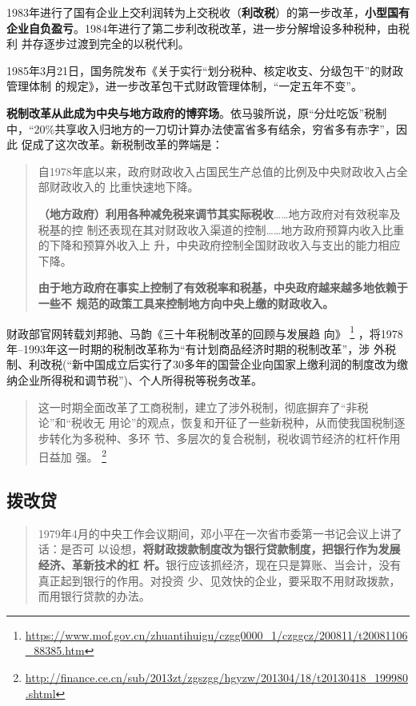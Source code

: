 1983年进行了国有企业上交利润转为上交税收（\textbf{利改税}）的第一步改革，\textbf{小型国有
  企业自负盈亏}。1984年进行了第二步利改税改革，进一步分解增设多种税种，由税利
并存逐步过渡到完全的以税代利。

1985年3月21日，国务院发布《关于实行“划分税种、核定收支、分级包干”的财政管理体制
的规定》，进一步改革包干式财政管理体制，“一定五年不变”。

\textbf{税制改革从此成为中央与地方政府的博弈场}。依马骏所说，原“分灶吃饭”税制
中，“20\%共享收入归地方的一刀切计算办法使富省多有结余，穷省多有赤字”，因此
促成了这次改革。新税制改革的弊端是：
\begin{quotation}
  自1978年底以来，政府财政收入占国民生产总值的比例及中央财政收入占全部财政收入的
  比重快速地下降。

  \textbf{（地方政府）利用各种减免税来调节其实际税收}……地方政府对有效税率及税基的控
  制还表现在其对财政收入渠道的控制……地方政府预算内收入比重的下降和预算外收入上
  升，中央政府控制全国财政收入与支出的能力相应下降。

  \textbf{由于地方政府在事实上控制了有效税率和税基，中央政府越来越多地依赖于一些不
    规范的政策工具来控制地方向中央上缴的财政收入。}\cite{majuncaigai}
\end{quotation}

财政部官网转载刘邦驰、马韵《三十年税制改革的回顾与发展趋
向》
\footnote{\url{https://www.mof.gov.cn/zhuantihuigu/czgg0000_1/czggcz/200811/t20081106_88385.htm}}
，将1978年--1993年这一时期的税制改革称为“有计划商品经济时期的税制改革”，涉
外税制、利改税(“新中国成立后实行了30多年的国营企业向国家上缴利润的制度改为缴
纳企业所得税和调节税”)、个人所得税等税务改革。
\begin{quotation}
  这一时期全面改革了工商税制，建立了涉外税制，彻底摒弃了“非税论”和“税收无
  用论”的观点，恢复和开征了一些新税种，从而使我国税制逐步转化为多税种、多环
  节、多层次的复合税制，税收调节经济的杠杆作用日益加
  强。
  \footnote{\url{http://finance.ce.cn/sub/2013zt/zgszgg/hgyzw/201304/18/t20130418_199980.shtml}}
\end{quotation}


\subsection{拨改贷}

\begin{quotation}
  1979年4月的中央工作会议期间，邓小平在一次省市委第一书记会议上讲了话：是否可
  以设想，\textbf{将财政拨款制度改为银行贷款制度，把银行作为发展经济、革新技术的杠
    杆。}银行应该抓经济，现在只是算账、当会计，没有真正起到银行的作用。对投资
  少、见效快的企业，要采取不用财政拨款，而用银行贷款的办法。\cite{bogaidai30}
\end{quotation}

